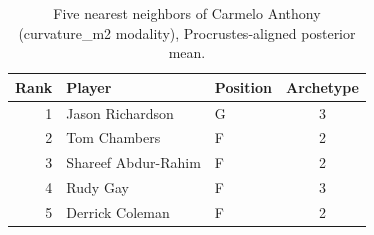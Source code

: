 \begin{table}[htbp]
  \centering\small
  \begin{tabular}{rllc}
    \toprule
    Rank & Player & Position & Archetype \\
    \midrule
    1 & Jason Richardson & G & 3 \\
    2 & Tom Chambers & F & 2 \\
    3 & Shareef Abdur-Rahim & F & 2 \\
    4 & Rudy Gay & F & 3 \\
    5 & Derrick Coleman & F & 2 \\
    \bottomrule
  \end{tabular}
  \caption{Five nearest neighbors of Carmelo Anthony (curvature_m2 modality), Procrustes-aligned posterior mean.}
  \label{tab:Carmelo_Anthony_neighbors_curvature_m2}
\end{table}

